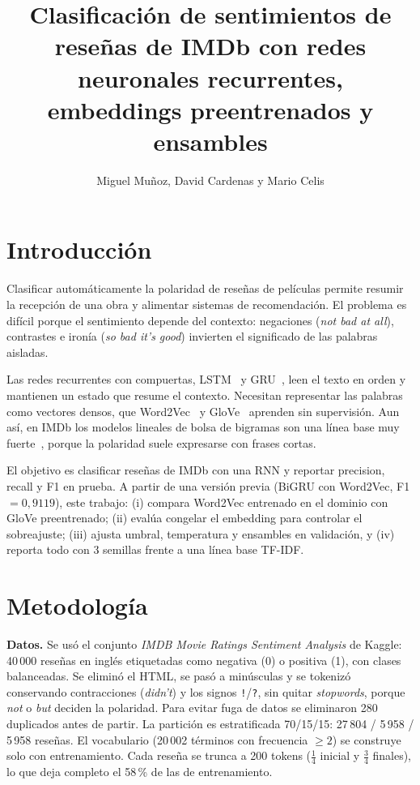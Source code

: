 \documentclass[letterpaper, 10 pt, conference]{ieeeconf}
\title{\LARGE \bf
Clasificación de sentimientos de reseñas de IMDb con redes neuronales recurrentes, embeddings preentrenados y ensambles
}
\author{Miguel Muñoz, David Cardenas y Mario Celis}
\begin{document}
\maketitle
\thispagestyle{empty}
\pagestyle{empty}

\section{Introducción}

Clasificar automáticamente la polaridad de reseñas de películas permite resumir la recepción de una obra y alimentar sistemas de recomendación. El problema es difícil porque el sentimiento depende del contexto: negaciones (\textit{not bad at all}), contrastes e ironía (\textit{so bad it's good}) invierten el significado de las palabras aisladas.

Las redes recurrentes con compuertas, LSTM~\cite{c1} y GRU~\cite{c2}, leen el texto en orden y mantienen un estado que resume el contexto. Necesitan representar las palabras como vectores densos, que Word2Vec~\cite{c3} y GloVe~\cite{c4} aprenden sin supervisión. Aun así, en IMDb los modelos lineales de bolsa de bigramas son una línea base muy fuerte~\cite{c5,c6}, porque la polaridad suele expresarse con frases cortas.

El objetivo es clasificar reseñas de IMDb con una RNN y reportar precision, recall y F1 en prueba. A partir de una versión previa (BiGRU con Word2Vec, F1 $=0{,}9119$), este trabajo: (i) compara Word2Vec entrenado en el dominio con GloVe preentrenado; (ii) evalúa congelar el embedding para controlar el sobreajuste; (iii) ajusta umbral, temperatura y ensambles en validación, y (iv) reporta todo con 3 semillas frente a una línea base TF-IDF.

\section{Metodología}

\textbf{Datos.} Se usó el conjunto \textit{IMDB Movie Ratings Sentiment Analysis} de Kaggle: 40\,000 reseñas en inglés etiquetadas como negativa (0) o positiva (1), con clases balanceadas. Se eliminó el HTML, se pasó a minúsculas y se tokenizó conservando contracciones (\textit{didn't}) y los signos \texttt{!}/\texttt{?}, sin quitar \textit{stopwords}, porque \textit{not} o \textit{but} deciden la polaridad. Para evitar fuga de datos se eliminaron 280 duplicados antes de partir. La partición es estratificada 70/15/15: 27\,804 / 5\,958 / 5\,958 reseñas. El vocabulario (20\,002 términos con frecuencia $\geq 2$) se construye solo con entrenamiento. Cada reseña se trunca a 200 tokens ($\frac{1}{4}$ inicial y $\frac{3}{4}$ finales), lo que deja completo el 58\,\% de las de entrenamiento.
\end{document}

